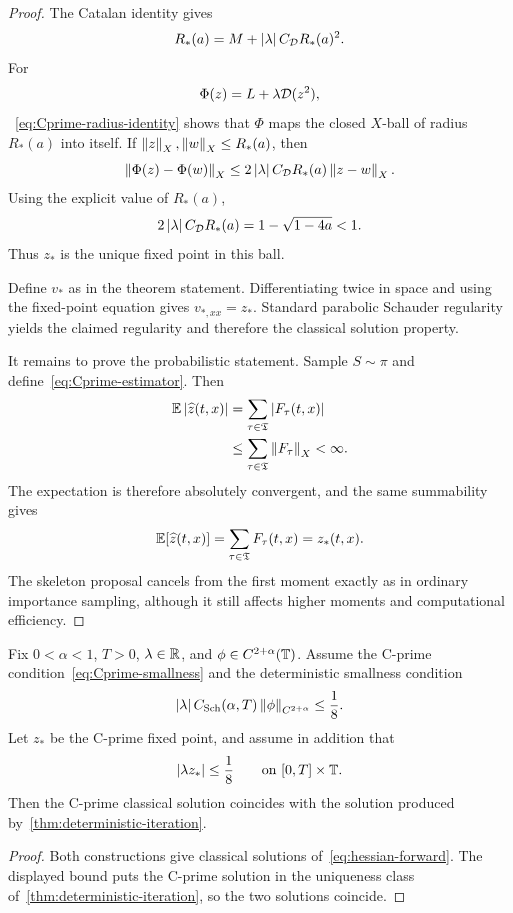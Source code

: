 \begin{proof}
The Catalan identity gives
\begin{equation}
  R_*(a)
  =
  M+\left|\lambda\right| C_{\mathcal D}R_*(a)^2.
  \label{eq:Cprime-radius-identity}
\end{equation}
For
\begin{equation*}
  \Phi(z)=L+\lambda\mathcal D(z^2),
\end{equation*}
~\eqref{eq:Cprime-radius-identity} shows that $\Phi$ maps the closed $X$-ball of radius $R_*(a)$ into itself. If $\left\lVert z\right\rVert_X,\left\lVert w\right\rVert_X\leq R_*(a)$, then
\begin{equation*}
  \left\lVert\Phi(z)-\Phi(w)\right\rVert_X
  \leq
  2\left|\lambda\right| C_{\mathcal D}R_*(a)\left\lVert z-w\right\rVert_X.
\end{equation*}
Using the explicit value of $R_*(a)$,
\begin{equation*}
  2\left|\lambda\right| C_{\mathcal D}R_*(a)
  =
  1-\sqrt{1-4a}<1.
\end{equation*}
Thus $z_*$ is the unique fixed point in this ball.

Define $v_*$ as in the theorem statement. Differentiating twice in space and using the fixed-point equation gives $v_{*,xx}=z_*$. Standard parabolic Schauder regularity yields the claimed regularity and therefore the classical solution property.

It remains to prove the probabilistic statement. Sample $S\sim\pi$ and define~\eqref{eq:Cprime-estimator}. Then
\begin{align*}
  \mathbb E\left|\widehat z(t,x)\right|
  &=
  \sum_{\tau\in\mathfrak T}\left|F_\tau(t,x)\right| \\
  &\leq
  \sum_{\tau\in\mathfrak T}\left\lVert F_\tau\right\rVert_X
  <\infty.
\end{align*}
The expectation is therefore absolutely convergent, and the same summability gives
\begin{equation*}
  \mathbb E[\widehat z(t,x)]
  =
  \sum_{\tau\in\mathfrak T}F_\tau(t,x)
  =
  z_*(t,x).
\end{equation*}
The skeleton proposal cancels from the first moment exactly as in ordinary importance sampling, although it still affects higher moments and computational efficiency.
\end{proof}

\begin{corollary}
\label{cor:Cprime-deterministic-overlap}
Fix $0<\alpha<1$, $T>0$, $\lambda\in\mathbb R$, and $\phi\in C^{2+\alpha}(\mathbb T)$. Assume the C-prime condition~\eqref{eq:Cprime-smallness} and the deterministic smallness condition
\begin{equation*}
  \left|\lambda\right| C_{\mathrm{Sch}}(\alpha,T)
  \left\lVert\phi\right\rVert_{C^{2+\alpha}}
  \leq\frac18.
\end{equation*}
Let $z_*$ be the C-prime fixed point, and assume in addition that
\begin{equation*}
  \left|\lambda z_*\right|\leq\frac18
  \qquad\text{on }[0,T]\times\mathbb T.
\end{equation*}
Then the C-prime classical solution coincides with the solution produced by~\cref{thm:deterministic-iteration}.
\end{corollary}

\begin{proof}
Both constructions give classical solutions of~\eqref{eq:hessian-forward}. The displayed bound puts the C-prime solution in the uniqueness class of~\cref{thm:deterministic-iteration}, so the two solutions coincide.
\end{proof}
